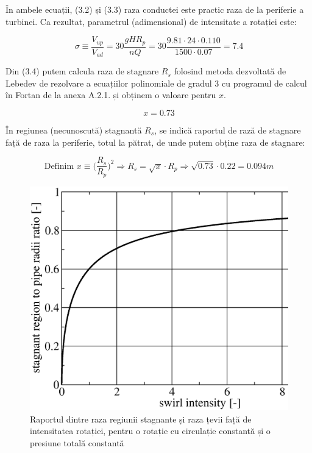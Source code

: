 În ambele ecuații, (3.2) și (3.3) raza conductei este practic raza de la periferie a turbinei. Ca rezultat, parametrul (adimensional) de intensitate a rotației este:

\begin{equation}
\sigma \equiv \frac{V_{up}}{V_{ad}} = 30 \frac{g H R_{p}}{n Q} = 30 \frac{9.81 \cdot 24 \cdot 0.110}{1500 \cdot 0.07} = 7.4
\end{equation}



Din (3.4) putem calcula raza de stagnare $R_{s}$ folosind metoda dezvoltată de Lebedev \cite{lebedev1991formulae} de rezolvare a ecuațiilor polinomiale de gradul 3 cu programul de calcul în Fortan de la anexa A.2.1. și obținem o valoare pentru $x$.

\begin{equation}
x = 0.73
\end{equation}

În regiunea (necunoscută) stagnantă $R_{s}$, se indică raportul de rază de stagnare față de raza la periferie, totul la pătrat, de unde putem obține raza de stagnare:

\begin{equation}
\text{Definim } x \equiv \bigg(\frac{R_{s}}{R_{p}}\bigg)^2 \Rightarrow R_{s} = \sqrt{x} \cdot R_{p} \Rightarrow \sqrt{0.73} \cdot 0.22 = 0.094\si{m}
\end{equation}

\begin{figure}[h!]
	\centering
	\includegraphics[scale=0.5]{figures/radius_stag-sigma.eps}
	\caption{Raportul dintre raza regiunii stagnante și raza țevii față de intensitatea rotației, pentru o rotație cu circulație constantă și o presiune totală constantă \cite{susanhub}}
	\label{Raportul dintre raza regiunii stagnante și raza țevii față de intensitatea rotației}
\end{figure}

